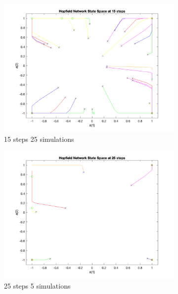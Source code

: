 \documentclass[11pt,conference,compsoc]{IEEEtran}
\begin{document}
\begin{figure}[]
\begin{subfigure}{0.33\linewidth}
        \includegraphics[width=\linewidth]{images/hopfield1_15steps_25sims.png}
        \caption{15 steps 25 simulations}
    \end{subfigure}
    \begin{subfigure}{0.33\linewidth}
        \includegraphics[width=\linewidth]{images/hopfield1_25steps_5sims.png}
        \caption{25 steps 5 simulations}
    \end{subfigure}
    \begin{subfigure}{0.33\linewidth}

\end{subfigure}
\end{figure}
\end{document}

